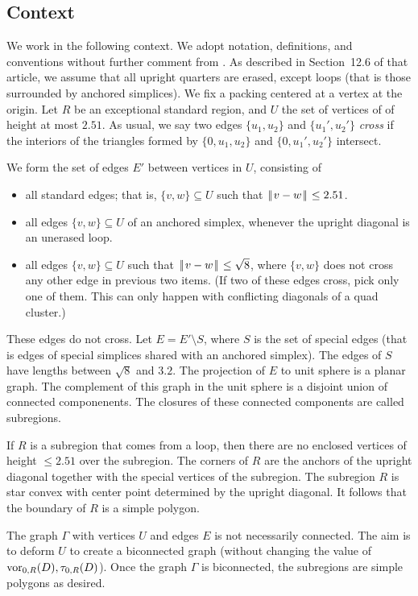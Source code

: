 \documentclass[11pt]{amsart}
\def\op#1{{\text{#1}}}
\def\text{\hbox}
\def\|{{\hskip0.1em|\hskip-0.15em|\hskip0.1em}}
\let\subset=\subseteq
\begin{document}
\subsection*{Context}

We work in the following context.  We adopt notation, definitions, and conventions without further comment
from \cite{Hales:2006:DCG}.  As described in Section~12.6 of that article, we assume that all upright quarters
are erased, except loops (that is those surrounded by anchored simplices).  We fix a packing centered at a vertex at the origin.  Let $R$ be an exceptional standard region, and
$U$ the set of vertices of of height at most $2.51$.  As usual, we say two edges $\{u_1,u_2\}$ and $\{u_1',u_2'\}$ {\it cross}
if the interiors of the triangles formed by $\{0,u_1,u_2\}$ and $\{0,u_1',u_2'\}$ intersect.

We form the set of edges $E'$ between vertices in $U$, consisting of
\begin{itemize}
\item all standard edges; that is, $\{v,w\}\subset U$ such that $\|v-w\|\le 2.51$.
\item all edges $\{v,w\}\subset U$ of an anchored simplex, whenever the upright diagonal is an unerased loop.
\item all edges $\{v,w\}\subset U$ such that $\|v-w\|\le\sqrt8$, where $\{v,w\}$ does not cross any other edge in previous two items.  (If two of these edges cross, pick only one of them. This can only happen with conflicting diagonals
of a quad cluster.)
\end{itemize}
These edges do not cross. 
Let $E=E'\setminus S$, where $S$ is the set of special edges (that
is edges of special simplices shared with an anchored simplex).
The edges of $S$ have lengths between $\sqrt8$ and $3.2$.
 The projection of $E$ to
unit sphere is a planar graph.
The complement of this graph in the unit sphere
is a disjoint union of connected componenents.  The closures of these connected components are called subregions.

If $R$ is a subregion that comes from a loop, then there are no enclosed vertices of height $\le 2.51$ over the
subregion.  The corners of $R$ are the anchors of the upright diagonal together with the special vertices
of the subregion.  The subregion $R$ is star convex with center point determined by the upright diagonal.
It follows that the boundary of $R$ is a simple polygon.

The graph $\Gamma$ with vertices $U$ and edges $E$ is not necessarily connected.  The aim is to deform
$U$ to create a biconnected graph (without changing the value of $\op{vor}_{0,R}(D),\tau_{0,R}(D)$).  Once the graph $\Gamma$
is biconnected, the subregions are simple polygons as desired.
\end{document}
